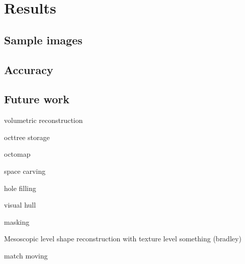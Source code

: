 \section{Results}

\subsection{Sample images}

\subsection{Accuracy}

\subsection{Future work}

volumetric reconstruction

octtree storage

octomap

space carving

hole filling

visual hull

masking

Mesoscopic level shape reconstruction with texture level something (bradley)

match moving
